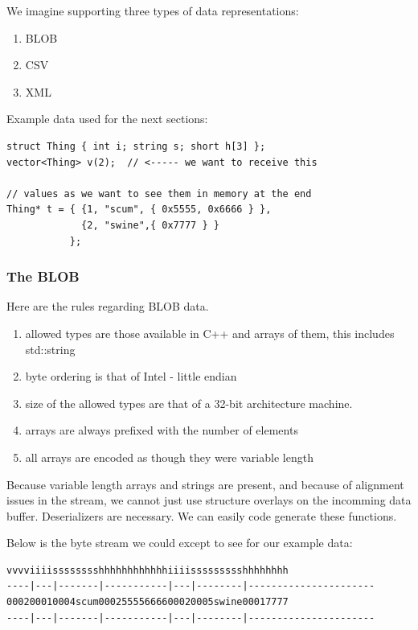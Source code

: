 We imagine supporting three types of data representations:
\begin{enumerate}
\item BLOB
\item CSV
\item XML
\end{enumerate}

Example data used for the next sections:
\begin{verbatim}
struct Thing { int i; string s; short h[3] };
vector<Thing> v(2);  // <----- we want to receive this

// values as we want to see them in memory at the end
Thing* t = { {1, "scum", { 0x5555, 0x6666 } },
             {2, "swine",{ 0x7777 } }
           };
\end{verbatim}

\subsubsection{The BLOB}
Here are the rules regarding BLOB data.

\begin{enumerate}
\item allowed types are those available in C++ and arrays of them, this includes std::string
\item byte ordering is that of Intel - little endian
\item size of the allowed types are that of a 32-bit architecture machine.
\item arrays are always prefixed with the number of elements
\item all arrays are encoded as though they were variable length
\end{enumerate}

Because variable length arrays and strings are present, and because of
alignment issues in the stream, we cannot just use structure overlays
on the incomming data buffer.  Deserializers are necessary.  We can easily code
generate these functions.

Below is the byte stream we could except to see for our example data:

\begin{verbatim}
vvvviiiisssssssshhhhhhhhhhhhiiiissssssssshhhhhhhh
----|---|-------|-----------|---|--------|----------------------
000200010004scum00025555666600020005swine00017777
----|---|-------|-----------|---|--------|----------------------
\end{verbatim}

